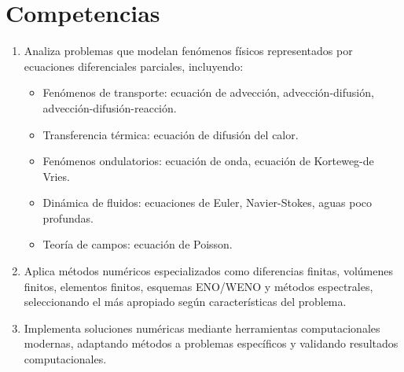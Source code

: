 \section{Competencias}

\begin{enumerate}[label=\arabic*., font=\bfseries, nosep]
	\item

	      Analiza problemas que modelan fenómenos físicos representados
	      por ecuaciones diferenciales parciales, incluyendo:

	      \begin{itemize}
		      \item

		            Fenómenos de transporte: ecuación de advección,
		            advección-difusión, advección-difusión-reacción.

		      \item

		            Transferencia térmica: ecuación de difusión del
		            calor.

		      \item

		            Fenómenos ondulatorios: ecuación de onda, ecuación de
		            Korteweg-de Vries.

		      \item

		            Dinámica de fluidos: ecuaciones de Euler,
		            Navier-Stokes, aguas poco profundas.

		      \item

		            Teoría de campos: ecuación de Poisson.
	      \end{itemize}
	\item

	      Aplica métodos numéricos especializados como diferencias
	      finitas, volúmenes finitos, elementos finitos, esquemas
	      ENO/WENO y métodos espectrales, seleccionando el más
	      apropiado según características del problema.

	\item

	      Implementa soluciones numéricas mediante herramientas
	      computacionales modernas, adaptando métodos a problemas
	      específicos y validando resultados computacionales.
\end{enumerate}

